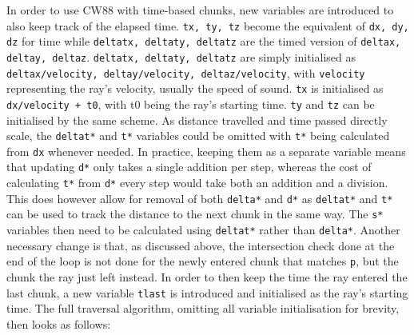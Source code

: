 In order to use CW88 with time-based chunks,
new variables are introduced to also keep track of the elapsed time.
\verb|tx, ty, tz| become the equivalent of \verb|dx, dy, dz| for time
while \verb|deltatx, deltaty, deltatz| are the timed version of \verb|deltax, deltay, deltaz|.
\newline
\verb|deltatx, deltaty, deltatz| are simply initialised as \verb|deltax/velocity, deltay/velocity, deltaz/velocity|,
with \verb|velocity| representing the ray's velocity, usually the speed of sound.
\verb|tx| is initialised as \verb|dx/velocity + t0|, with t0 being the ray's starting time.
\verb|ty| and \verb|tz| can be initialised by the same scheme.
\newline
As distance travelled and time passed directly scale,
the \verb|deltat*| and \verb|t*| variables could be omitted with \verb|t*| being calculated from \verb|dx| whenever needed.
In practice, keeping them as a separate variable means that updating \verb|d*| only takes a single addition per step,
whereas the cost of calculating \verb|t*| from \verb|d*| every step would take both an addition and a division.
\newline
This does however allow for removal of both \verb|delta*| and \verb|d*|
as \verb|deltat*| and \verb|t*| can be used to track the distance to the next chunk in the same way.
The \verb|s*| variables then need to be calculated using \verb|deltat*| rather than \verb|delta*|.
\newline
Another necessary change is that, as discussed above,
the intersection check done at the end of the loop is not done for the newly entered chunk that matches \verb|p|,
but the chunk the ray just left instead.
In order to then keep the time the ray entered the last chunk,
a new variable \verb|tlast| is introduced and initialised as the ray's starting time.
\newline
The full traversal algorithm, omitting all variable initialisation for brevity, then looks as follows:

